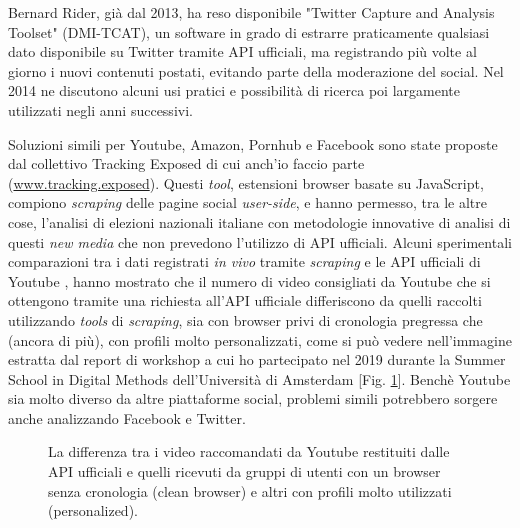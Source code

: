 Bernard Rider, già dal 2013, ha reso disponibile "Twitter Capture and Analysis Toolset" (DMI-TCAT), un software in grado di estrarre praticamente qualsiasi dato disponibile su Twitter tramite API ufficiali, ma registrando più volte al giorno i nuovi contenuti postati, evitando parte della moderazione del social. Nel 2014 ne discutono alcuni usi pratici e possibilità di ricerca \citep{bruns2014} poi largamente utilizzati negli anni successivi.

Soluzioni simili per Youtube, Amazon, Pornhub e Facebook sono state proposte dal collettivo Tracking Exposed di cui anch'io faccio parte
(\url{www.tracking.exposed}). Questi \textit{tool}, estensioni browser basate su JavaScript, compiono \textit{scraping} delle pagine social \textit{user-side}, e hanno permesso, tra le altre cose, l'analisi di elezioni nazionali italiane con metodologie innovative di analisi di questi \textit{new media} \citep{hargreaves2019} che non prevedono l'utilizzo di API ufficiali. Alcuni sperimentali comparazioni tra i dati registrati \textit{in vivo} tramite \textit{scraping} e le API ufficiali di Youtube \citep{yttrex2019}, hanno mostrato che il numero di video consigliati da Youtube che si ottengono tramite una richiesta all'API ufficiale differiscono da quelli raccolti utilizzando \textit{tools} di \textit{scraping}, sia con browser privi di cronologia pregressa che (ancora di più), con profili molto personalizzati, come si può vedere nell'immagine estratta dal report di workshop a cui ho partecipato nel 2019 durante la Summer School in Digital Methods dell'Università di Amsterdam [Fig. \ref{fig:api}]. Benchè Youtube sia molto diverso da altre piattaforme social, problemi simili potrebbero sorgere anche analizzando Facebook e Twitter.
\begin{figure}
	\caption{La differenza tra i video raccomandati da Youtube restituiti dalle API ufficiali e quelli ricevuti da gruppi di utenti con un browser senza cronologia (clean browser) e altri con profili molto utilizzati (personalized).}
	\label{fig:api}
\end{figure}

